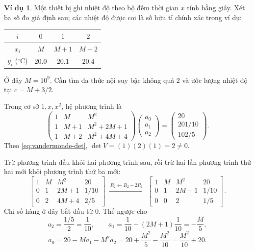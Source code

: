 \documentclass[12pt,a4paper,oneside]{book}
\numberwithin{algorithm}{chapter}
\theoremstyle{definition}
\newtheorem{vidu}{Ví dụ}[chapter]
\begin{document}
\begin{vidu}
Một thiết bị ghi nhiệt độ theo bộ đếm thời gian $x$ tính bằng giây. Xét ba số đo giả định sau; các nhiệt độ được coi là số hữu tỉ chính xác trong ví dụ:
\begin{center}
\begin{tabular}{c|ccc}
\toprule
$i$ & $0$ & $1$ & $2$\\
\midrule
$x_i$ & $M$ & $M+1$ & $M+2$\\
$y_i$ (${ }^{\circ}\mathrm C$) & $20.0$ & $20.1$ & $20.4$\\
\bottomrule
\end{tabular}
\end{center}
Ở đây $M=10^9$. Cần tìm đa thức nội suy bậc không quá $2$ và ước lượng nhiệt độ tại $c=M+3/2$.

Trong cơ sở $1,x,x^2$, hệ phương trình là
\[
 \begin{pmatrix}
 1&M&M^2\\
 1&M+1&M^2+2M+1\\
 1&M+2&M^2+4M+4
 \end{pmatrix}
 \begin{pmatrix}a_0\\a_1\\a_2\end{pmatrix}
 =\begin{pmatrix}20\\201/10\\102/5\end{pmatrix}.
\]
Theo \eqref{eq:vandermonde-det}, $\det V=(1)(2)(1)=2\ne0$.

Trừ phương trình đầu khỏi hai phương trình sau, rồi trừ hai lần phương trình thứ hai mới khỏi phương trình thứ ba mới:
\[
 \left[
 \begin{array}{ccc|c}
 1&M&M^2&20\\
 0&1&2M+1&1/10\\
 0&2&4M+4&2/5
 \end{array}\right]
 \ \xrightarrow{\ R_2\gets R_2-2R_1\ }\
 \left[
 \begin{array}{ccc|c}
 1&M&M^2&20\\
 0&1&2M+1&1/10\\
 0&0&2&1/5
 \end{array}\right].
\]
Chỉ số hàng ở đây bắt đầu từ $0$. Thế ngược cho
\[
 a_2=\frac{1/5}{2}=\frac1{10},\qquad
 a_1=\frac1{10}-(2M+1)\frac1{10}=-\frac M5,
\]
\[
 a_0=20-Ma_1-M^2a_2
 =20+\frac{M^2}5-\frac{M^2}{10}
 =\frac{M^2}{10}+20.
\]


\end{vidu}
\end{document}
